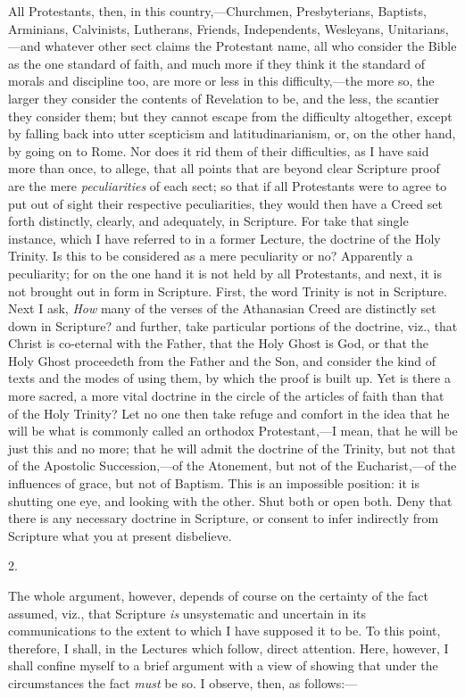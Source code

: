 All Protestants, then, in this country,—Churchmen, Presbyterians,
Baptists, Arminians, Calvinists, Lutherans, Friends, Independents,
Wesleyans, Unitarians,—and whatever other sect claims the Protestant
name, all who consider the Bible as the one standard of faith, and
much more if they think it the standard of morals and discipline too,
are more or less in this difficulty,—the more so, the larger they
consider the contents of Revelation to be, and the less, the scantier
they consider them; but they cannot escape from the difficulty
altogether, except by falling back into utter scepticism and
latitudinarianism, or, on the other hand, by going on to Rome. Nor
does it rid them of their difficulties, as I have said more than once,
to allege, that all points that are beyond clear Scripture proof are
the mere \emph{peculiarities} of each sect; so that if all Protestants
were to agree to put out of sight their respective peculiarities, they
would then have a Creed set forth distinctly, clearly, and adequately,
in Scripture. For take that single instance, which I have referred to
in a former Lecture, the doctrine of the Holy Trinity. Is this to be
considered as a mere peculiarity or no? Apparently a peculiarity; for
on the one hand it is not held by all Protestants, and next, it is not brought out in form in Scripture. First, the word Trinity is
not in Scripture. Next I ask, \emph{How} many of the verses of the
Athanasian Creed are distinctly set down in Scripture? and further,
take particular portions of the doctrine, viz., that Christ is
co-eternal with the Father, that the Holy Ghost is God, or that the
Holy Ghost proceedeth from the Father and the Son, and consider the
kind of texts and the modes of using them, by which the proof is built
up. Yet is there a more sacred, a more vital doctrine in the circle of
the articles of faith than that of the Holy Trinity? Let no one then
take refuge and comfort in the idea that he will be what is commonly
called an orthodox Protestant,—I mean, that he will be just this and
no more; that he will admit the doctrine of the Trinity, but not that
of the Apostolic Succession,—of the Atonement, but not of the
Eucharist,—of the influences of grace, but not of Baptism. This is
an impossible position: it is shutting one eye, and looking with the
other. Shut both or open both. Deny that there is any necessary
doctrine in Scripture, or consent to infer indirectly from Scripture
what you at present disbelieve.

2.

The whole argument, however, depends of course on the certainty of
the fact assumed, viz., that Scripture \emph{is} unsystematic and
uncertain in its communications to the extent to which I have supposed
it to be. To this point, therefore, I shall, in the Lectures which
follow, direct attention. Here, however, I shall confine myself to a
brief argument with a view of showing that under the circumstances the
fact \emph{must} be so. I observe, then, as follows:—

